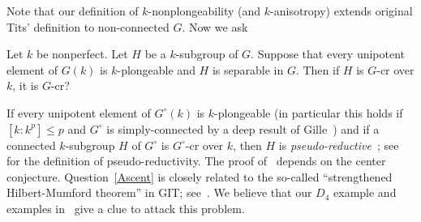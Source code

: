 Note that our definition of $k$-nonplongeability (and $k$-anisotropy) extends original Tits' definition to non-connected $G$. Now we ask
\begin{question}\label{Ascent}
Let $k$ be nonperfect. Let $H$ be a $k$-subgroup of $G$. Suppose that every unipotent element of $G(k)$ is $k$-plongeable and $H$ is separable in $G$. Then if $H$ is $G$-cr over $k$, it is $G$-cr?
\end{question} 
\begin{rem}
If every unipotent element of $G^{\circ}(k)$ is $k$-plongeable (in particular this holds if $[k:k^p]\leq p$ and $G^{\circ}$ is simply-connected by a deep result of Gille~\cite{Gille-unipotent-Duke}) and if a connected $k$-subgroup $H$ of $G^{\circ}$ is $G^{\circ}$-cr over $k$, then $H$ is \emph{pseudo-reductive}~\cite[Thm.~1.9]{Uchiyama-Nonperfect-pre}; see~\cite[Def.~1.1.1]{Conrad-pred-book} for the definition of pseudo-reductivity. The proof of~\cite[Thm.~1.9]{Uchiyama-Nonperfect-pre} depends on the center conjecture. Question~\ref{Ascent} is closely related to the so-called ``strengthened Hilbert-Mumford theorem'' in GIT; see~\cite[Sec.~5]{Bate-cocharacter-Arx}. We believe that our $D_4$ example and examples in~\cite{Uchiyama-Nonperfect-pre} give a clue to attack this problem.
\end{rem}
  
